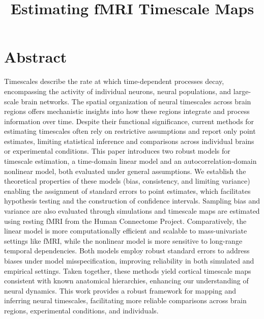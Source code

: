 \documentclass[9pt]{article}
\title{Estimating fMRI Timescale Maps}
\date{}
\begin{document}
\maketitle

\section*{Abstract}
Timescales describe the rate at which time-dependent processes decay, encompassing the activity of individual neurons, neural populations, and large-scale brain networks. The spatial organization of neural timescales across brain regions offers mechanistic insights into how these regions integrate and process information over time. Despite their functional significance, current methods for estimating timescales often rely on restrictive assumptions and report only point estimates, limiting statistical inference and comparisons across individual brains or experimental conditions. This paper introduces two robust models for timescale estimation, a time-domain linear model and an autocorrelation-domain nonlinear model, both evaluated under general assumptions. We establish the theoretical properties of these models (bias, consistency, and limiting variance) enabling the assignment of standard errors to point estimates, which facilitates hypothesis testing and the construction of confidence intervals. Sampling bias and variance are also evaluated through simulations and timescale maps are estimated using resting fMRI from the Human Connectome Project. Comparatively, the linear model is more computationally efficient and scalable to mass-univariate settings like fMRI, while the nonlinear model is more sensitive to long-range temporal dependencies. Both models employ robust standard errors to address biases under model misspecification, improving reliability in both simulated and empirical settings. Taken together, these methods yield cortical timescale maps consistent with known anatomical hierarchies, enhancing our understanding of neural dynamics. This work provides a robust framework for mapping and inferring neural timescales, facilitating more reliable comparisons across brain regions, experimental conditions, and individuals.







\end{document}
